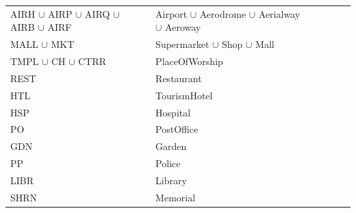 \begin{table}[ht]
\begin{threeparttable}
\begin{tabulary}{\textwidth}{LRLRRRR}
AIRH $\cup$ AIRP $\cup$ AIRQ $\cup$ AIRB $\cup$ AIRF	&	&Airport $\cup$ Aerodrome $\cup$ Aerialway $\cup$ Aeroway
													&		&		&	&\\
MALL $\cup$ MKT					&		&Supermarket $\cup$ Shop $\cup$ Mall		
													&		&		&	&\\
TMPL $\cup$ CH $\cup$ CTRR			&		&PlaceOfWorship			&		&		&	&\\
REST						&		&Restaurant			&		&		&	&\\
HTL						&		&TourismHotel			&		&		&	&\\
HSP						&		&Hospital			&		&		&	&\\
PO						&		&PostOffice			&		&		&	&\\
GDN						&		&Garden				&		&		&	&\\
PP						&		&Police				&		&		&	&\\
LIBR						&		&Library			&		&		&	&\\
SHRN						&		&Memorial			&		&		&	&\\

\end{tabulary}
\end{threeparttable}
\end{table}
